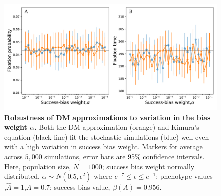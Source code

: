 \documentclass[12pt]{extarticle}
\begin{document}
\begin{figure}
    \includegraphics[width=\linewidth]{full_vs_dm_changing_alpha.pdf}
   \caption{\textbf{Robustness of DM approximations to variation in the bias weight $\alpha$.} 
   Both the DM approximation (orange) and Kimura's equation (black line) fit the stochastic simulations (blue) well even with a high variation in success bias weight. %
   Markers for average across $5,000$ simulations, error bars are 95\% confidence intervals.
  Here, population size, $N=1000$; success bias weight normally distributed, $\alpha \sim N(0.5,\epsilon^2)$ where $e^{-7}\le \epsilon \le e^{-1}$; %
  phenotype values ,$\hat{A}=1$,$A=0.7$; success bias value, $\beta(A)=0.956$.}	
  \label{fig:hetro_alpha}
\end{figure}
\end{document}
